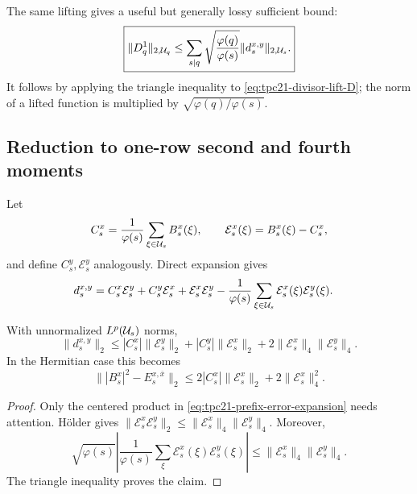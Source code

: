 The same lifting gives a useful but generally lossy sufficient bound:
\begin{equation}
 \boxed{
 \lVert D_q^{1}\rVert_{2,\mathcal U_q}
 \le\sum_{s\mid q}
 \sqrt{\frac{\varphi(q)}{\varphi(s)}}
 \lVert d_s^{x,y}\rVert_{2,\mathcal U_s}.}
 \label{eq:tpc21-prefix-triangle-bound}
\end{equation}
It follows by applying the triangle inequality to
\eqref{eq:tpc21-divisor-lift-D}; the norm of a lifted function is
multiplied by \(\sqrt{\varphi(q)/\varphi(s)}\).

\subsection{Reduction to one-row second and fourth moments}

Let
\begin{equation}
 C_s^x=\frac1{\varphi(s)}\sum_{\xi\in\mathcal U_s}B_s^x(\xi),
 \qquad
 \mathcal E_s^x(\xi)=B_s^x(\xi)-C_s^x,
 \label{eq:tpc21-one-row-centered-prefix}
\end{equation}
and define \(C_s^y,\mathcal E_s^y\) analogously.  Direct expansion gives
\begin{align}
 d_s^{x,y}
 ={}&C_s^x\mathcal E_s^y+C_s^y\mathcal E_s^x
 +\mathcal E_s^x\mathcal E_s^y
 -\frac1{\varphi(s)}\sum_{\xi\in\mathcal U_s}
   \mathcal E_s^x(\xi)\mathcal E_s^y(\xi).
 \label{eq:tpc21-prefix-error-expansion}
\end{align}

\begin{proposition}
\label{prop:tpc21-one-row-moment-transfer}
With unnormalized \(L^p(\mathcal U_s)\) norms,
\begin{equation}
 \boxed{
 \lVert d_s^{x,y}\rVert_2
 \le |C_s^x|\lVert\mathcal E_s^y\rVert_2
    +|C_s^y|\lVert\mathcal E_s^x\rVert_2
    +2\lVert\mathcal E_s^x\rVert_4
      \lVert\mathcal E_s^y\rVert_4.}
 \label{eq:tpc21-one-row-moment-transfer}
\end{equation}
In the Hermitian case this becomes
\begin{equation}
 \lVert |B_s^x|^2-E_s^{x,\overline x}\rVert_2
 \le2|C_s^x|\lVert\mathcal E_s^x\rVert_2
 +2\lVert\mathcal E_s^x\rVert_4^2.
 \label{eq:tpc21-hermitian-fourth-moment-gate}
\end{equation}
\end{proposition}

\begin{proof}
Only the centered product in
\eqref{eq:tpc21-prefix-error-expansion} needs attention.  H\"older gives
\(\lVert\mathcal E_s^x\mathcal E_s^y\rVert_2
 \le\lVert\mathcal E_s^x\rVert_4
      \lVert\mathcal E_s^y\rVert_4\).
Moreover,
\[
 \sqrt{\varphi(s)}
 \left|\frac1{\varphi(s)}\sum_\xi
 \mathcal E_s^x(\xi)\mathcal E_s^y(\xi)\right|
 \le \lVert\mathcal E_s^x\rVert_4
      \lVert\mathcal E_s^y\rVert_4.
\]
The triangle inequality proves the claim.
\end{proof}

